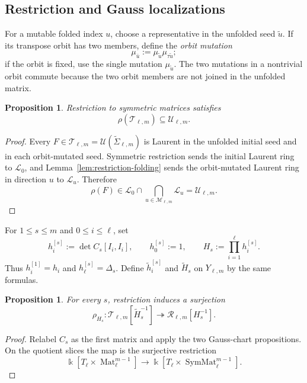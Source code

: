 \documentclass[11pt]{amsart}
\newtheorem{proposition}[theorem]{Proposition}
\theoremstyle{definition}
\theoremstyle{remark}
\newcommand{\kk}{\Bbbk}
\newcommand{\SymMat}{\operatorname{SymMat}}
\newcommand{\cR}{\mathcal R}
\newcommand{\cT}{\mathcal T}
\newcommand{\cU}{\mathcal U}
\newcommand{\Mat}{\operatorname{Mat}}
\begin{document}
\subsection{Restriction and Gauss localizations}
\label{subsec:restriction-upper-bound}

For a mutable folded index $u$, choose a representative in the unfolded seed
$\widetilde u$.  If its transpose orbit has two members, define the
\emph{orbit mutation}
\[ \mu_{\bar u}:=\mu_{\widetilde u}\mu_{\tau\widetilde u}; \]
if the orbit is fixed, use the single mutation $\mu_{\widetilde u}$.  The
two mutations in a nontrivial orbit commute because the two orbit members
are not joined in the unfolded matrix.

\begin{proposition}
\label{prop:source-restriction-in-U}
Restriction to symmetric matrices satisfies
\[ \rho(\cT_{\ell,m})\subseteq\cU_{\ell,m}. \]
\end{proposition}

\begin{proof}
Every $F\in\cT_{\ell,m}=\mathcal U(\widetilde\Sigma_{\ell,m})$ is Laurent
in the unfolded initial seed and in each orbit-mutated seed.  Symmetric
restriction sends the initial Laurent ring to $\mathcal L_0$, and
Lemma~\ref{lem:restriction-folding} sends the orbit-mutated Laurent ring in
direction $u$ to $\mathcal L_u$.  Therefore
\[ \rho(F)\in\mathcal L_0\cap \bigcap_{u\in\mathscr M_{\ell,m}}\mathcal L_u =\cU_{\ell,m}. \]
\end{proof}

For $1\le s\le m$ and $0\le i\le\ell$, set
\[ h_i^{[s]}:=\det C_s[I_i,I_i], \qquad h_0^{[s]}:=1, \qquad H_s:=\prod_{i=1}^{\ell}h_i^{[s]}. \]
Thus $h_i^{[1]}=h_i$ and $h_\ell^{[s]}=\Delta_s$.  Define
$\widetilde h_i^{[s]}$ and $\widetilde H_s$ on $Y_{\ell,m}$ by the
same formulas.

\begin{proposition}
\label{prop:all-localized-restrictions}
For every $s$, restriction induces a surjection
\[ \rho_{H_s}:\cT_{\ell,m}[\widetilde H_s^{-1}] \twoheadrightarrow\cR_{\ell,m}[H_s^{-1}]. \]
\end{proposition}

\begin{proof}
Relabel $C_s$ as the first matrix and apply the two Gauss-chart
propositions.  On the quotient slices the map is the surjective restriction
\[ \kk[T_\ell\times\Mat_\ell^{m-1}] \longrightarrow \kk[T_\ell\times\SymMat_\ell^{m-1}]. \]
\end{proof}
\end{document}
